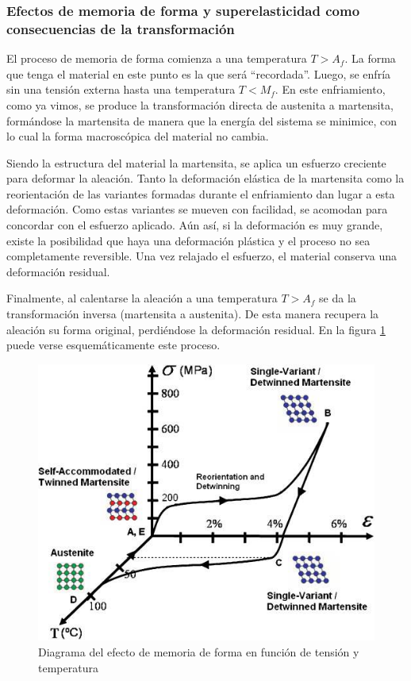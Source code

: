 \documentclass[12pt]{article}
\theoremstyle{definition}
\theoremstyle{remark}
\begin{document}
\subsubsection{Efectos de memoria de forma y superelasticidad como consecuencias de la transformación}

El proceso de memoria de forma comienza a una temperatura $T>A_f$. La forma que tenga el material en este punto es la que será ``recordada''. Luego, se enfría sin una tensión externa hasta una temperatura $T<M_f$. En este enfriamiento, como ya vimos, se produce la transformación directa de austenita a martensita, formándose la martensita de manera que la energía del sistema se minimice, con lo cual la forma macroscópica del material no cambia.

Siendo la estructura del material la martensita, se aplica un esfuerzo creciente para deformar la aleación. Tanto la deformación elástica de la martensita como la reorientación de las variantes formadas durante el enfriamiento dan lugar a esta deformación. Como estas variantes se mueven con facilidad, se acomodan para concordar con el esfuerzo aplicado. Aún así, si la deformación es muy grande, existe la posibilidad que haya una deformación plástica y el proceso no sea completamente reversible. Una vez relajado el esfuerzo, el material conserva una deformación residual.

Finalmente, al calentarse la aleación a una temperatura $T>A_f$ se da la transformación inversa (martensita a austenita). De esta manera recupera la aleación su forma original, perdiéndose la deformación residual. En la figura \ref{3DGraph} puede verse esquemáticamente este proceso.

\begin{figure}[H]
	\centering
	\includegraphics[scale=0.5]{img/3dCycle.png}
	\caption{Diagrama del efecto de memoria de forma en función de tensión y temperatura}
	\label{3DGraph}
\end{figure}
\end{document}
